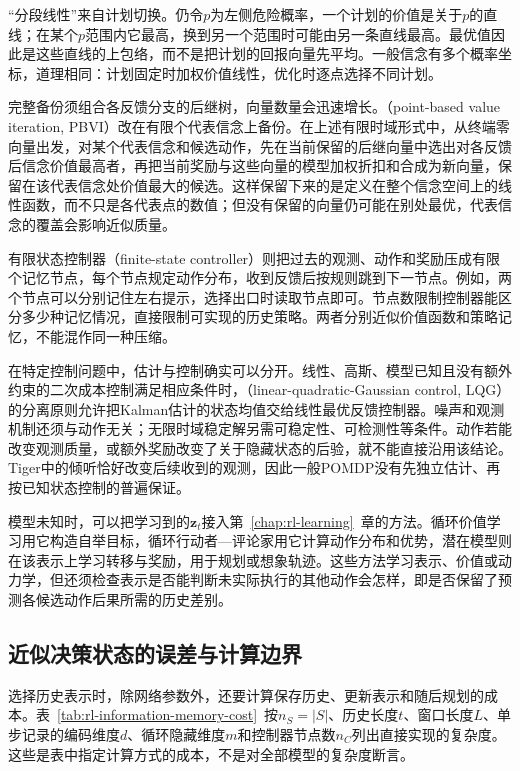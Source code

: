 “分段线性”来自计划切换。仍令$p$为左侧危险概率，一个计划的价值是关于$p$的直线；在某个$p$范围内它最高，换到另一个范围时可能由另一条直线最高。最优值因此是这些直线的上包络，而不是把计划的回报向量先平均。一般信念有多个概率坐标，道理相同：计划固定时加权价值线性，优化时逐点选择不同计划。

完整备份须组合各反馈分支的后继树，向量数量会迅速增长。（point-based value iteration, PBVI）改在有限个代表信念上备份。在上述有限时域形式中，从终端零向量出发，对某个代表信念和候选动作，先在当前保留的后继向量中选出对各反馈后信念价值最高者，再把当前奖励与这些向量的模型加权折扣和合成为新向量，保留在该代表信念处价值最大的候选。这样保留下来的是定义在整个信念空间上的线性函数，而不只是各代表点的数值；但没有保留的向量仍可能在别处最优，代表信念的覆盖会影响近似质量。

有限状态控制器（finite-state controller）则把过去的观测、动作和奖励压成有限个记忆节点，每个节点规定动作分布，收到反馈后按规则跳到下一节点。例如，两个节点可以分别记住左右提示，选择出口时读取节点即可。节点数限制控制器能区分多少种记忆情况，直接限制可实现的历史策略。两者分别近似价值函数和策略记忆，不能混作同一种压缩。

在特定控制问题中，估计与控制确实可以分开。线性、高斯、模型已知且没有额外约束的二次成本控制满足相应条件时，（linear-quadratic-Gaussian control, LQG）的分离原则允许把Kalman估计的状态均值交给线性最优反馈控制器。噪声和观测机制还须与动作无关；无限时域稳定解另需可稳定性、可检测性等条件。动作若能改变观测质量，或额外奖励改变了关于隐藏状态的后验，就不能直接沿用该结论。Tiger中的倾听恰好改变后续收到的观测，因此一般POMDP没有先独立估计、再按已知状态控制的普遍保证。

模型未知时，可以把学习到的$\bm z_t$接入第~\ref{chap:rl-learning}~章的方法。循环价值学习用它构造自举目标，循环行动者—评论家用它计算动作分布和优势，潜在模型则在该表示上学习转移与奖励，用于规划或想象轨迹。这些方法学习表示、价值或动力学，但还须检查表示是否能判断未实际执行的其他动作会怎样，即是否保留了预测各候选动作后果所需的历史差别。

\subsection{近似决策状态的误差与计算边界}
\label{sec:rl-information-memory-errors}

选择历史表示时，除网络参数外，还要计算保存历史、更新表示和随后规划的成本。表~\ref{tab:rl-information-memory-cost}~按$n_S=|S|$、历史长度$t$、窗口长度$L$、单步记录的编码维度$d$、循环隐藏维度$m$和控制器节点数$n_C$列出直接实现的复杂度。这些是表中指定计算方式的成本，不是对全部模型的复杂度断言。


